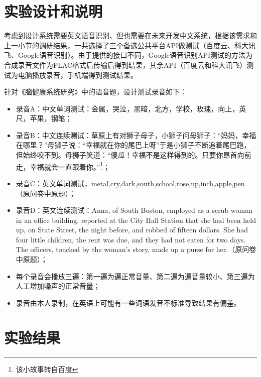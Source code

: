 \section{实验设计和说明}

考虑到设计系统需要英文语音识别、但也需要在未来开发中文系统，根据该需求和上一小节的调研结果，一共选择了三个备选公共平台API做测试（百度云、科大讯飞、Google语音识别）。由于提供的接口不同，Google语音识别API测试的方法为合成录音文件为FLAC格式后传输后得到结果，其余API（百度云和科大讯飞）测试为电脑播放录音，手机端得到测试结果。

针对《脑健康系统研究》中的语音题，设计测试录音如下：

\begin{itemize}
\item 录音A：中文单词测试：金属，哭泣，黑暗，北方，学校，玫瑰，向上，英尺，苹果，钢笔；
\item	录音B：中文连续测试：草原上有对狮子母子，小狮子问母狮子：“妈妈，幸福在哪里？”母狮子说：“幸福就在你的尾巴上呀”于是小狮子不断追着尾巴跑，但始终咬不到。母狮子笑道：“傻瓜！幸福不是这样得到的。只要你昂首向前走，幸福就会一直跟着你。”\footnote{该小故事转自百度}；
\item 录音C：英文单词测试，metal,cry,dark,south,school,rose,up,inch,apple,pen（原问卷中原题）；
\item 录音D：英文连续测试：Anna, of South Boston, employed as a scrub woman in an office building, reported at the City Hall Station that she had been held up, on State Street, the night before, and robbed of fifteen dollars. She had four little children, the rent was due, and they had not eaten for two days. The officers, touched by the woman’s story, made up a purse for her.（原问卷中原题）；
\item 每个录音会播放三遍：第一遍为遍正常音量、第二遍为遍音量较小、第三遍为人工增加噪声的正常音量；
\item 录音由本人录制，在英语上可能有一些词语发音不标准导致结果有偏差。
\end{itemize}

\section{实验结果}

